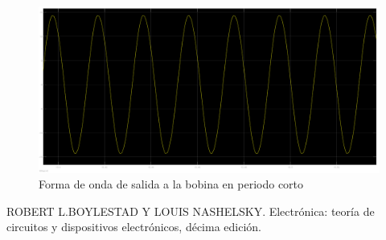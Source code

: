\documentclass[12pt]{article}
\begin{document}
\begin{figure}[H]
\centering
\includegraphics[scale=0.3]{src/images/Onda_muy_corta.png}
\caption{Forma de onda de salida a la bobina en periodo corto}
\label{fgr:Onda_corta}
\end{figure}

\newpage

\begin{thebibliography}{99}
 ROBERT L.BOYLESTAD Y LOUIS NASHELSKY. Electrónica: teoría de circuitos y dispositivos electrónicos, décima edición.
\end{thebibliography}
\end{document}
